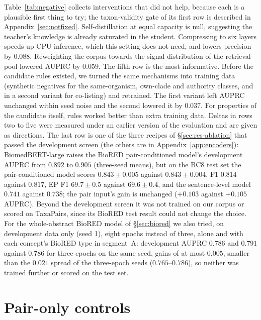 \documentclass[11pt]{article}
\newcommand{\bench}{\mbox{TaxaPairs}}
\begin{document}
Table~\ref{tab:negative} collects interventions that did not help, because each is a plausible first
thing to try; the taxon-validity gate of its first row is described in Appendix~\ref{sec:notfixed}. Self-distillation at equal capacity is null, suggesting the teacher's knowledge is
already saturated in the student. Compressing to six layers speeds up CPU inference, which this setting does not need, and lowers precision by $0.088$. Reweighting the corpus towards the signal distribution of the retrieval
pool lowered AUPRC by $0.059$. The fifth row is the most informative. Before the candidate rules existed, we
turned the same mechanisms into training data (synthetic negatives for the same-organism,
own-clade and authority classes, and in a second variant for co-listing) and retrained. The first
variant left AUPRC unchanged within seed noise and the second lowered it by $0.037$. For properties of the candidate itself, rules worked better than extra training data. Deltas in
rows two to five were measured under an earlier version of the evaluation and are given as
directions. The last row is one of the three recipes of \S\ref{sec:res-ablation} that passed the
development screen (the others are in Appendix~\ref{app:encoders}): BiomedBERT-large raises the
BioRED pair-conditioned model's development AUPRC from $0.892$ to $0.905$ (three-seed means), but on
the BC8 test set the pair-conditioned model scores $0.843 \pm 0.005$ against $0.843 \pm 0.004$, F1
$0.814$ against $0.817$, EP F1 $69.7 \pm 0.5$ against $69.6 \pm 0.4$, and the sentence-level model
$0.741$ against $0.738$; the pair input's gain is unchanged ($+0.103$ against $+0.105$ AUPRC)\@. Beyond the development screen it was not trained on our
corpus or scored on \bench{}, since its BioRED test result could not change the choice.
For the whole-abstract BioRED model of \S\ref{sec:biored} we also tried, on development data only
(seed 1), eight epochs instead of three, alone and with each concept's BioRED type in segment~A:
development AUPRC $0.786$ and $0.791$ against $0.786$ for three epochs on the same seed, gains of at
most $0.005$, smaller than the $0.021$ spread of the three-epoch seeds ($0.765$--$0.786$), so neither was trained
further or scored on the test set.

\section{Pair-only controls}
\label{app:paironly}
\end{document}
